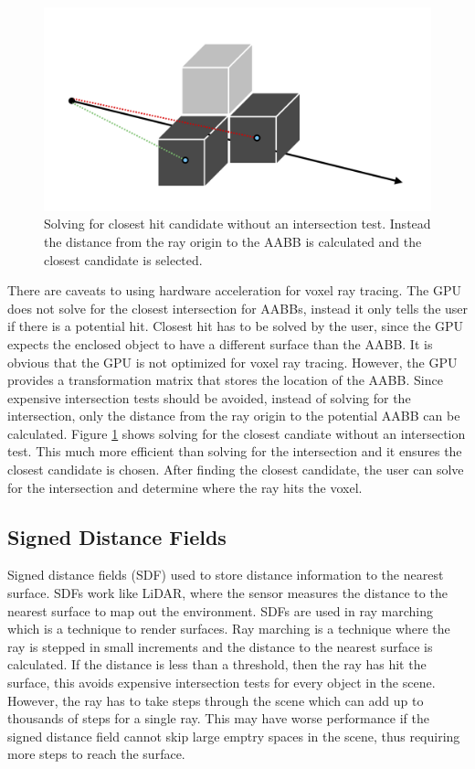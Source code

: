 \documentclass[12pt]{article}
\begin{document}
\begin{figure}[h]
    \begin{center}
        \includegraphics[scale=0.22]{ClosestHit-Approx}
    \end{center}
    \caption{
        Solving for closest hit candidate without an intersection test.
        Instead the distance from the ray origin to the AABB is calculated and the closest candidate is selected.}
    \label{fig:ClosestHit-Approx}
\end{figure}

There are caveats to using hardware acceleration for voxel ray tracing.
The GPU does not solve for the closest intersection for AABBs, instead it only tells the user if there is a potential hit.
Closest hit has to be solved by the user, since the GPU expects the enclosed object to have a different surface than the AABB.
It is obvious that the GPU is not optimized for voxel ray tracing.
However, the GPU provides a transformation matrix that stores the location of the AABB.
Since expensive intersection tests should be avoided, instead of solving for the intersection, only the distance from the ray origin to the potential AABB can be calculated.
Figure \ref{fig:ClosestHit-Approx} shows solving for the closest candiate without an intersection test.
This much more efficient than solving for the intersection and it ensures the closest candidate is chosen.
After finding the closest candidate, the user can solve for the intersection and determine where the ray hits the voxel.


\subsection{Signed Distance Fields}

Signed distance fields (SDF) used to store distance information to the nearest surface. 
SDFs work like LiDAR, where the sensor measures the distance to the nearest surface to map out the environment.
SDFs are used in ray marching which is a technique to render surfaces. 
Ray marching is a technique where the ray is stepped in small increments and the distance to the nearest surface is calculated.
If the distance is less than a threshold, then the ray has hit the surface, this avoids expensive intersection tests for every object in the scene.
However, the ray has to take steps through the scene which can add up to thousands of steps for a single ray.
This may have worse performance if the signed distance field cannot skip large emptry spaces in the scene, thus
requiring more steps to reach the surface.
\end{document}
